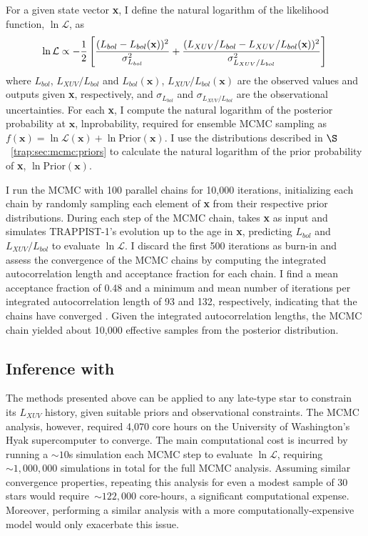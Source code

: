 For a given state vector \textbf{x}, I define the natural logarithm of the likelihood function, $\ln \mathcal{L}$, as
\small
\begin{equation} \label{trap:eqn:lnlike}
    \ln \mathcal{L} \propto -\frac{1}{2} \left[ \frac{(L_{bol} - L_{bol}(\textbf{x}))^2}{\sigma_{L_{bol}}^2} + \frac{(L_{XUV}/L_{bol} - L_{XUV}/L_{bol}(\textbf{x}))^2}{\sigma_{L_{XUV}/L_{bol}}^2} \right] \\
\end{equation}
\normalsize
where $L_{bol}$, $L_{XUV}/L_{bol}$ and $L_{bol}(\textbf{x})$, $L_{XUV}/L_{bol}(\textbf{x})$ are the observed values and \vplanet outputs given \textbf{x}, respectively, and $\sigma_{L_{bol}}$ and $\sigma_{L_{XUV}/L_{bol}}$ are the observational uncertainties. For each \textbf{x}, I compute the natural logarithm of the posterior probability at $\textbf{x}$, lnprobability, required for ensemble MCMC sampling as $f(\textbf{x}) = \ln \mathcal{L}(\textbf{x}) + \ln \mathrm{Prior}(\textbf{x})$. I use the distributions described in $\S$~\ref{trap:sec:mcmc:priors} to calculate the natural logarithm of the prior probability of \textbf{x}, $\ln \mathrm{Prior}(\textbf{x})$. 

I run the MCMC with 100 parallel chains for 10,000 iterations, initializing each chain by randomly sampling each element of \textbf{x} from their respective prior distributions. During each step of the MCMC chain, \vplanet takes \textbf{x} as input and simulates TRAPPIST-1's evolution up to the age in \textbf{x}, predicting $L_{bol}$ and $L_{XUV}/L_{bol}$ to evaluate $\ln \mathcal{L}$. I discard the first 500 iterations as burn-in and assess the convergence of the MCMC chains by computing the integrated autocorrelation length and acceptance fraction for each chain. I find a mean acceptance fraction of 0.48 and a minimum and mean number of iterations per integrated autocorrelation length of 93 and 132, respectively, indicating that the chains have converged \citep{ForemanMackey2013}. Given the integrated autocorrelation lengths, the MCMC chain yielded about 10,000 effective samples from the posterior distribution.

\subsection{Inference with \approxposterior} \label{trap:sec:methods:approx}

The methods presented above can be applied to any late-type star to constrain its $L_{XUV}$ history, given suitable priors and observational constraints. The MCMC analysis, however, required 4,070 core hours on the University of Washington's Hyak supercomputer to converge. The main computational cost is incurred by running a ${\sim}10$s \vplanet simulation each MCMC step to evaluate $\ln \mathcal{L}$, requiring ${\sim}1,000,000$ simulations in total for the full MCMC analysis. Assuming similar convergence properties, repeating this analysis for even a modest sample of 30 stars would require~${\sim} 122,000$ core-hours, a significant computational expense. Moreover, performing a similar analysis with a more computationally-expensive model would only exacerbate this issue.

